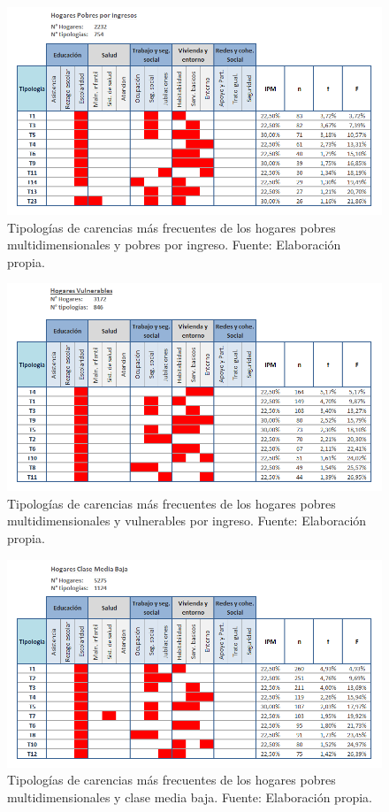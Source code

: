\documentclass[12pt,letterpaper,spanish]{article}
\begin{document}
\begin{figure}[H]
    \centering
    \includegraphics[width=\textwidth]{Max/tipol_pobres.png}
    \caption{Tipologías de carencias más frecuentes de los hogares pobres multidimensionales y pobres por ingreso. Fuente: Elaboración propia.}
    \label{TipPob}
\end{figure}

\begin{figure}[H]
    \centering
    \includegraphics[width=\textwidth]{Max/tipol_vulnerables.png}
    \caption{Tipologías de carencias más frecuentes de los hogares pobres multidimensionales y vulnerables por ingreso. Fuente: Elaboración propia.}
    \label{TipVul}
\end{figure}

\begin{figure}[H]
    \centering
    \includegraphics[width=\textwidth]{Max/tipol_CMB.png}
    \caption{Tipologías de carencias más frecuentes de los hogares pobres multidimensionales y clase media baja. Fuente: Elaboración propia.}
    \label{TipCMB}
\end{figure}
\end{document}
